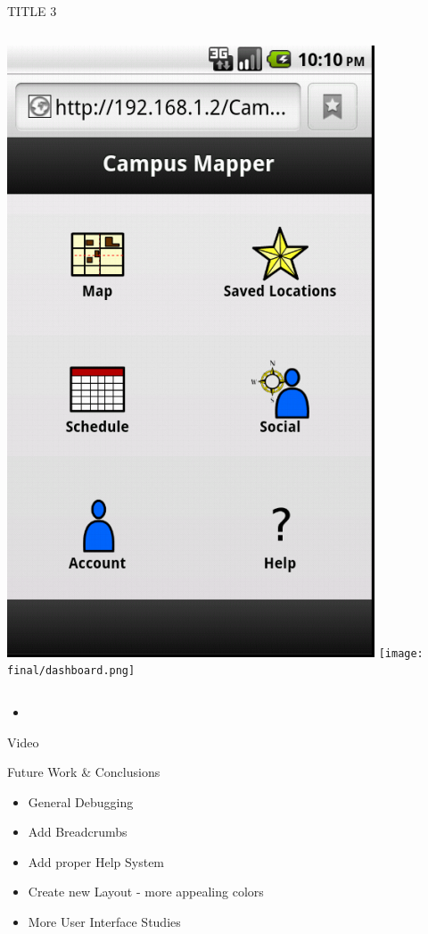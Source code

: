 \documentclass{beamer}
\begin{document}
\begin{frame}{TITLE 3}
    \begin{columns}[c]
        \center\includegraphics[height=0.5 \textheight]{final-pre-h/dashboard.png}
        \center\texttt{[image: final/dashboard.png]}
    \end{columns}
    \begin{itemize}
        \item 
    \end{itemize}
\end{frame}

\begin{frame}{Video}
\end{frame}

\begin{frame}{Future Work \& Conclusions}
    \begin{itemize}
        \item General Debugging
        \item Add Breadcrumbs
        \item Add proper Help System
        \item Create new Layout - more appealing colors
        \item More User Interface Studies
    \end{itemize}
\end{frame}
\end{document}

